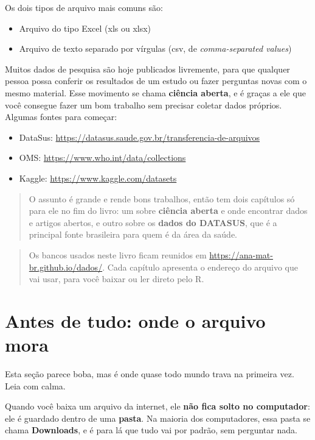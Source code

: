 \documentclass[
]{book}
\begin{document}
Os dois tipos de arquivo mais comuns são:

\begin{itemize}
\item
  Arquivo do tipo Excel (xls ou xlsx)
\item
  Arquivo de texto separado por vírgulas (csv, de \emph{comma-separated values})
\end{itemize}

Muitos dados de pesquisa são hoje publicados livremente, para que qualquer pessoa possa conferir os resultados de um estudo ou fazer perguntas novas com o mesmo material. Esse movimento se chama \textbf{ciência aberta}, e é graças a ele que você consegue fazer um bom trabalho sem precisar coletar dados próprios. Algumas fontes para começar:

\begin{itemize}
\item
  DataSus: \url{https://datasus.saude.gov.br/transferencia-de-arquivos}
\item
  OMS: \url{https://www.who.int/data/collections}
\item
  Kaggle: \url{https://www.kaggle.com/datasets}
\end{itemize}

\begin{quote}
O assunto é grande e rende bons trabalhos, então tem dois capítulos só para ele no fim do livro: um sobre \textbf{ciência aberta} e onde encontrar dados e artigos abertos, e outro sobre os \textbf{dados do DATASUS}, que é a principal fonte brasileira para quem é da área da saúde.
\end{quote}

\begin{quote}
Os bancos usados neste livro ficam reunidos em \url{https://ana-mat-br.github.io/dados/}. Cada capítulo apresenta o endereço do arquivo que vai usar, para você baixar ou ler direto pelo R.
\end{quote}

\section{Antes de tudo: onde o arquivo mora}\label{antes-de-tudo-onde-o-arquivo-mora}

Esta seção parece boba, mas é onde quase todo mundo trava na primeira vez. Leia com calma.

Quando você baixa um arquivo da internet, ele \textbf{não fica solto no computador}: ele é guardado dentro de uma \textbf{pasta}. Na maioria dos computadores, essa pasta se chama \textbf{Downloads}, e é para lá que tudo vai por padrão, sem perguntar nada.
\end{document}
